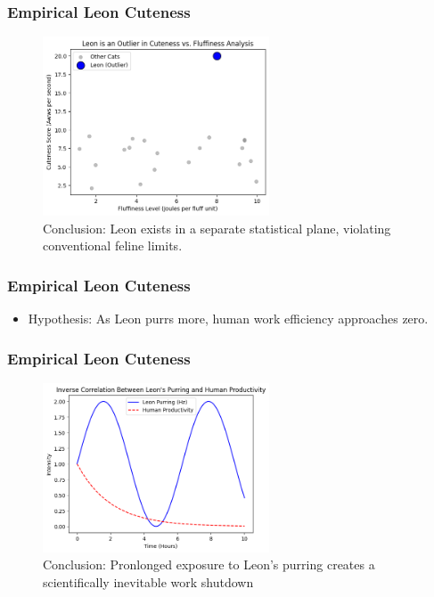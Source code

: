 \documentclass[compress]{beamer}
\begin{document}
\begin{frame}
\frametitle{Empirical Leon Cuteness}
\begin{center}
  \begin{figure}[h]
    \includegraphics[width=0.6\textwidth]{images/leon_outlier.png} %
\caption{Conclusion: Leon exists in a separate statistical plane, violating conventional feline limits.}
\label{fig:egypt_cat} %
  \end{figure}  

\end{center}
\end{frame}

\begin{frame}
\frametitle{Empirical Leon Cuteness}
\begin{itemize}
  \item Hypothesis: As Leon purrs more, human work efficiency approaches zero.
\end{itemize} 
\end{frame}




\begin{frame}
\frametitle{Empirical Leon Cuteness}
\begin{center}
  \begin{figure}[h]
    \includegraphics[width=0.6\textwidth]{images/leon_purring.png} %
\caption{Conclusion: Pronlonged exposure to Leon's purring creates a scientifically inevitable work shutdown}
\label{fig:egypt_cat} %
  \end{figure}  

\end{center}
\end{frame}
\end{document}
